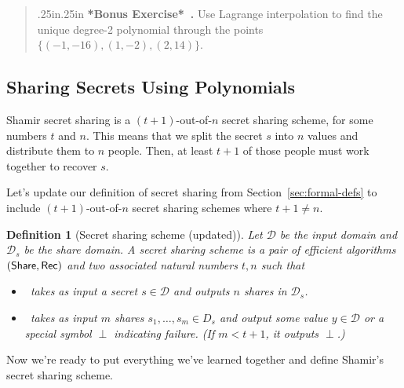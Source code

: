 \documentclass[12 pt]{article}
\newtheorem{definition}{Definition}
\def\D{\ensuremath{\mathcal{D}}}
\newcounter{exercise}[section]
\newenvironment{bonus}{\refstepcounter{exercise}\par\bigskip \begin{quotation}{}{\leftmargin .25in\rightmargin .25in}
    \noindent \textbf{*Bonus Exercise*~\thesection.\theexercise }  \rmfamily}{\end{quotation}\par\bigskip}
\begin{document}
\begin{bonus}
    Use Lagrange interpolation to find the unique degree-2 
    polynomial through the points $\{(-1,-16),(1,-2),(2,14)\}$.
\end{bonus}

\subsection{Sharing Secrets Using Polynomials}

Shamir secret sharing is a $(t+1)$-out-of-$n$ secret sharing scheme, for some numbers $t$ and $n$. This means that we split the secret $s$ into $n$ values and distribute them to $n$ people. Then, at least $t+1$ of those people must work together to recover $s$.

Let's update our definition of secret sharing from Section~\ref{sec:formal-defs}
to include $(t+1)$-out-of-$n$ secret sharing schemes where $t+1 \neq n$.

\begin{definition}[Secret sharing scheme (updated)]\label{def:ss-update}
    Let $\D$ be the input domain and $\D_s$ be the share domain.
    A secret sharing scheme is a pair of efficient algorithms $(\mathsf{Share}, \mathsf{Rec})$
    and two associated natural numbers $t,n$ such that

    \begin{itemize}
        \item \share~takes as input a secret $s \in \D$ and outputs $n$ 
        shares in $\D_s$.
        \item \rec~takes as input $m$ shares $s_1, \ldots, s_m \in D_s$ 
        and output some value $y \in \D$ or a special symbol $\perp$ 
        indicating failure. (If $m < t+1$, it outputs $\perp$.)
    \end{itemize}
\end{definition}

Now we're ready to put everything we've learned together and define 
Shamir's secret sharing scheme\footnotemark.
\end{document}
